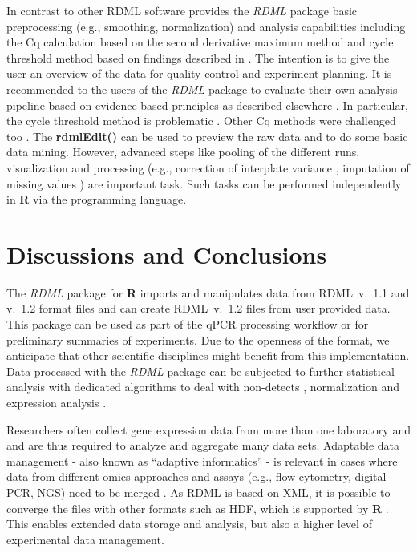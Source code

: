\documentclass{bioinfo}
\begin{document}
In contrast to other RDML software provides the \textit{RDML} package basic 
preprocessing (e.g., smoothing, normalization) and analysis capabilities including the Cq calculation based on 
the second derivative maximum method and cycle threshold method based on 
findings described in \cite{roediger_RJ_2013, roediger2015chippcr, 
spiess_impact_2014, spiess_system-specific_2016}. The intention is to give the 
user an overview of the data for quality control and experiment planning. It 
is recommended to the users of the \textit{RDML} package to evaluate their own 
analysis pipeline based on evidence based principles as described elsewhere 
\cite{ritz_qpcr_2008, roediger2015r}. In particular, the cycle threshold method 
is problematic \cite{spiess_impact_2014, spiess_system-specific_2016}. Other Cq 
methods were challenged too \cite{ruijter_evaluation_2013}.
The \textbf{rdmlEdit()} can be used to preview the raw data and to do some basic 
data mining. However, advanced steps like pooling of the different runs, 
visualization and processing (e.g., correction of interplate variance \cite{ruijter_removal_2015}, 
imputation of missing values \cite{mccall_non-detects_2014}) are important task. Such tasks can be performed 
independently in \textbf{R} via the programming language.

\section{Discussions and Conclusions}

The \textit{RDML} package for \textbf{R} imports and manipulates data 
from RDML~v.~1.1 and v.~1.2 format files and can create RDML~v.~1.2 files 
from user provided data. This package can be used as part of the qPCR 
processing workflow or for preliminary summaries of experiments. Due to the 
openness of the format, we anticipate that other scientific disciplines might 
benefit from this implementation. Data processed with the \textit{RDML} package 
can be subjected to further statistical analysis with dedicated algorithms to 
deal with non-detects \cite{mccall_non-detects_2014}, normalization 
\cite{perkins_readqpcr_2012} and expression analysis \cite{dvinge_htqpcr:_2009, matz_no_2013}.

Researchers often collect gene expression data from more than one laboratory and 
and are thus required to analyze and aggregate many data sets. Adaptable data 
management - also known as “adaptive informatics” - is relevant in cases where 
data from different omics approaches and assays (e.g., flow cytometry, digital 
PCR, NGS) need to be merged \cite{baker_quantitative_2012}. As RDML is based on 
XML, it is possible to converge the files with other formats such as HDF, 
\cite{millard_adaptive_2011} which is supported by \textbf{R} 
\cite{Fischer_HDF5}. This enables extended data storage and analysis, but also a 
higher level of experimental data management.
\end{document}
